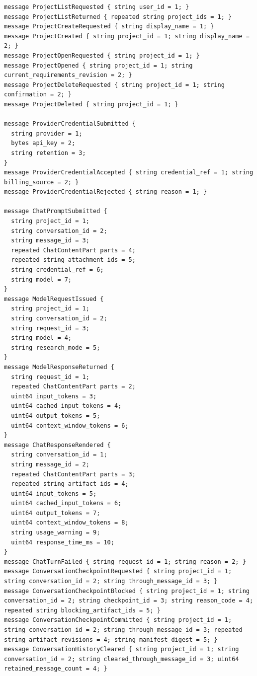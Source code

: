 \begin{lstlisting}[language={},basicstyle=\ttfamily\tiny,breaklines=true]
message ProjectListRequested { string user_id = 1; }
message ProjectListReturned { repeated string project_ids = 1; }
message ProjectCreateRequested { string display_name = 1; }
message ProjectCreated { string project_id = 1; string display_name = 2; }
message ProjectOpenRequested { string project_id = 1; }
message ProjectOpened { string project_id = 1; string current_requirements_revision = 2; }
message ProjectDeleteRequested { string project_id = 1; string confirmation = 2; }
message ProjectDeleted { string project_id = 1; }

message ProviderCredentialSubmitted {
  string provider = 1;
  bytes api_key = 2;
  string retention = 3;
}
message ProviderCredentialAccepted { string credential_ref = 1; string billing_source = 2; }
message ProviderCredentialRejected { string reason = 1; }

message ChatPromptSubmitted {
  string project_id = 1;
  string conversation_id = 2;
  string message_id = 3;
  repeated ChatContentPart parts = 4;
  repeated string attachment_ids = 5;
  string credential_ref = 6;
  string model = 7;
}
message ModelRequestIssued {
  string project_id = 1;
  string conversation_id = 2;
  string request_id = 3;
  string model = 4;
  string research_mode = 5;
}
message ModelResponseReturned {
  string request_id = 1;
  repeated ChatContentPart parts = 2;
  uint64 input_tokens = 3;
  uint64 cached_input_tokens = 4;
  uint64 output_tokens = 5;
  uint64 context_window_tokens = 6;
}
message ChatResponseRendered {
  string conversation_id = 1;
  string message_id = 2;
  repeated ChatContentPart parts = 3;
  repeated string artifact_ids = 4;
  uint64 input_tokens = 5;
  uint64 cached_input_tokens = 6;
  uint64 output_tokens = 7;
  uint64 context_window_tokens = 8;
  string usage_warning = 9;
  uint64 response_time_ms = 10;
}
message ChatTurnFailed { string request_id = 1; string reason = 2; }
message ConversationCheckpointRequested { string project_id = 1; string conversation_id = 2; string through_message_id = 3; }
message ConversationCheckpointBlocked { string project_id = 1; string conversation_id = 2; string checkpoint_id = 3; string reason_code = 4; repeated string blocking_artifact_ids = 5; }
message ConversationCheckpointCommitted { string project_id = 1; string conversation_id = 2; string through_message_id = 3; repeated string artifact_revisions = 4; string manifest_digest = 5; }
message ConversationHistoryCleared { string project_id = 1; string conversation_id = 2; string cleared_through_message_id = 3; uint64 retained_message_count = 4; }


\end{lstlisting}
